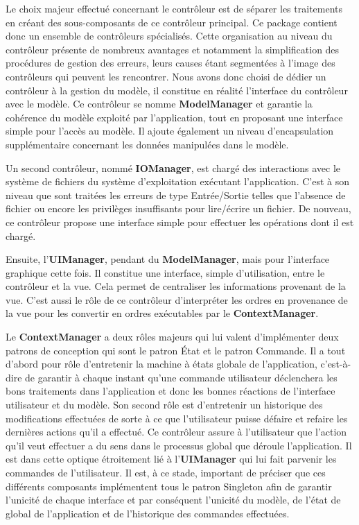\documentclass[paper=a4, fontsize=11pt]{report}
\numberwithin{equation}{section}		%
\numberwithin{figure}{section}		%
\numberwithin{table}{section}		%
\renewcommand{\bf}[1]{\textbf{#1}}
\begin{document}
Le choix majeur effectué concernant le contrôleur est de séparer les traitements en créant des sous-composants de ce contrôleur principal. Ce package contient donc un ensemble de  contrôleurs spécialisés. Cette organisation au niveau du contrôleur présente de nombreux avantages et notamment la simplification des procédures de gestion des erreurs, leurs causes étant segmentées à l'image des contrôleurs qui peuvent les rencontrer. 
Nous avons donc choisi de dédier un contrôleur à la gestion du modèle, il constitue en réalité l'interface du contrôleur avec le modèle. Ce contrôleur se nomme \bf{ModelManager} et garantie la cohérence du modèle exploité par l'application, tout en proposant une interface simple pour l'accès au modèle. Il ajoute également un niveau d'encapsulation supplémentaire concernant les données manipulées dans le modèle. 

Un second contrôleur, nommé \bf{IOManager}, est chargé des interactions avec le système de fichiers du système d'exploitation exécutant l'application. C’est à son niveau que sont traitées les erreurs de type Entrée/Sortie telles que l'absence de fichier ou encore les privilèges insuffisants pour lire/écrire un fichier. De nouveau, ce contrôleur propose une interface simple pour effectuer les opérations dont il est chargé. 

Ensuite, l'\bf{UIManager}, pendant du \bf{ModelManager}, mais pour l'interface graphique cette fois. Il constitue une interface, simple d'utilisation, entre le contrôleur et la vue. Cela permet de centraliser les informations provenant de la vue. C'est aussi le rôle de ce contrôleur d'interpréter les ordres en provenance de la vue pour les convertir en ordres exécutables par le \bf{ContextManager}. 

Le \bf{ContextManager} a deux rôles majeurs qui lui valent d'implémenter deux patrons de conception qui sont le patron État et le patron Commande. Il a tout d'abord pour rôle d'entretenir la machine à états globale de l'application, c'est-à-dire de garantir à chaque instant qu'une commande utilisateur déclenchera les bons traitements dans l'application et donc les bonnes réactions de l'interface utilisateur et du modèle. Son second rôle est d'entretenir un historique des modifications effectuées de sorte à ce que l'utilisateur puisse défaire et refaire les dernières actions qu'il a effectué. Ce contrôleur assure à l'utilisateur que l'action qu'il veut effectuer a du sens dans le processus global que déroule l'application. Il est dans cette optique étroitement lié à l'\bf{UIManager} qui lui fait parvenir les commandes de l'utilisateur.
Il est, à ce stade, important de préciser que ces différents composants implémentent tous le patron Singleton afin de garantir l'unicité de chaque interface et par conséquent l'unicité du modèle, de l'état de global de l'application et de l'historique des commandes effectuées.
\end{document}
